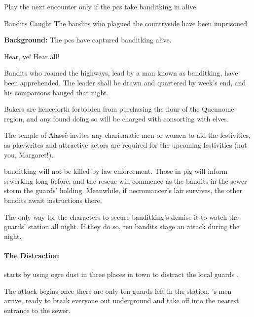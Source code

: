 \banditking



Play the next encounter only if the \glspl{pc} take \gls{banditking} in alive.

\resumecontents[Town]

{Bandits Caught}%
{The bandits who plagued the countryside have been imprisoned}%

\stopcontents[Town]

\textbf{Background:}
The \glspl{pc} have captured \gls{banditking} alive.

\begin{boxtext}

  Hear, ye!  Hear all!

  Bandits who roamed the highways, lead by a man known as \gls{banditking}, have been apprehended.  The leader shall be drawn and quartered by week's end, and his companions hanged that night.

  Bakers are henceforth forbidden from purchasing the flour of the Quennome region, and any found doing so will be charged with consorting with elves.

  The temple of Alass\"e invites any charismatic men or women to aid the festivities, as playwrites and attractive actors are required for the upcoming festivities (not you, Margaret!).

\end{boxtext}

\Gls{banditking} will not be killed by law enforcement.
Those in \gls{pig} will inform \gls{sewerking} long before, and the rescue will commence as the bandits in the sewer storm the guards' holding.
Meanwhile, if \gls{necromancer}'s lair survives, the other bandits await instructions there.


The only way for the characters to secure \gls{banditking}'s demise it to watch the guards' station all night.
If they do so, ten bandits stage an attack during the night.

\paragraph{The Distraction} starts by using ogre dust in three places in town to distract the local guards%
\iftoggle{aif}{(see \textit{Fenestra}, \autopageref{ogredust} for Ogre Dust)}{}.

The attack begins once there are only ten guards left in the station.
's men arrive, ready to break everyone out underground and take off into the nearest entrance to the sewer.

\stopcontents[sq]


